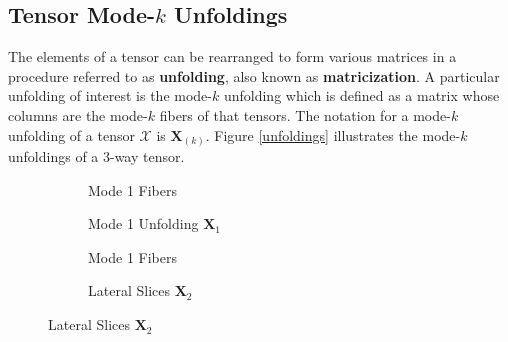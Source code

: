 \subsection[Tensor Mode-k Unfoldings]{Tensor Mode-$k$ Unfoldings} \label{sec:Tensor Mode k Unfolding}
    The elements of a tensor can be rearranged to form various matrices in a
    procedure referred to as \textbf{unfolding}, also known as
    \textbf{matricization}. A particular unfolding of interest is the mode-$k$
    unfolding which is defined as a matrix whose columns are the mode-$k$ fibers
    of that tensors. The notation for a mode-$k$ unfolding of a tensor
    $\mathcal{X}$ is $\mathbf{X}_{(k)}$. Figure \ref{unfoldings} illustrates the
    mode-$k$ unfoldings of a 3-way tensor.

    \begin{figure}[ht!]
        \def\m{2}
        \def\n{1.5}
        \def\p{1}
        \def\mslices{6}
        \def\nslices{5}
        \def\pslices{4}
        \def\rot{90}

        \centering
        
        \begin{subfigure}[b]{0.24\textwidth}
            \centering
            
            \caption[Column Fibers]{Mode 1 Fibers}
        \end{subfigure}
        \hfill
        \begin{subfigure}[b]{0.74\textwidth}
            \centering
            
            \caption[Mode 1 Unfolding]{Mode 1 Unfolding $\mathbf{X}_1$}
        \end{subfigure}

        \vspace{1em}

        \begin{subfigure}[b]{0.24\textwidth}
            \centering
            
            \caption[Row Fibers]{Mode 1 Fibers}
        \end{subfigure}
        \hfill
        \begin{subfigure}[b]{0.74\textwidth}
            \centering
            
            \caption[Row Fibers]{Lateral Slices $\mathbf{X}_2$}
        \end{subfigure}


\end{figure}
